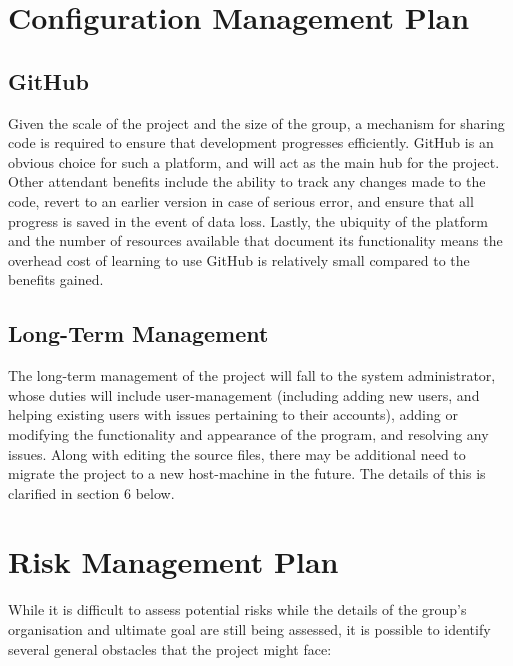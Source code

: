 \documentclass[11pt]{article}
\begin{document}
\section{Configuration Management Plan}
\subsection{GitHub}
Given the scale of the project and the size of the group, a mechanism for sharing code is required
to ensure that development progresses efficiently. GitHub is an obvious choice for such a platform,
and will act as the main hub for the project. Other attendant benefits include the ability to track
any changes made to the code, revert to an earlier version in case of serious error, and ensure that
all progress is saved in the event of data loss. Lastly, the ubiquity of the platform and the number
of resources available that document its functionality means the overhead cost of learning to use
GitHub is relatively small compared to the benefits gained.

\subsection{Long-Term Management}
The long-term management of the project will fall to the system administrator, whose duties will
include user-management (including adding new users, and helping existing users with issues pertaining
to their accounts), adding or modifying the functionality and appearance of the program, and
resolving any issues. Along with editing the source files, there may be additional need to migrate
the project to a new host-machine in the future. The details of this is clarified in section 6
below.

\section{Risk Management Plan}
While it is difficult to assess potential risks while the details of the group's organisation and
ultimate goal are still being assessed, it is possible to identify several general obstacles that
the project might face:
\end{document}
